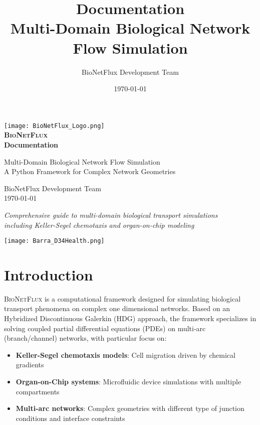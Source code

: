 \documentclass[11pt,a4paper]{article}
\title{\Huge {\textbf{\bionetflux{} Documentation}} \\[0.5cm]
       \Large Multi-Domain Biological Network Flow Simulation}
\author{BioNetFlux Development Team}
\date{\today}
\newcommand{\bionetflux}{\textsc{BioNetFlux}}
\begin{document}
\begin{titlepage}
    \centering
    
    \texttt{[image: BioNetFlux\_Logo.png]}\\[1cm]
    
    {\Huge \textbf{\bionetflux{}} \\[0.5cm]}
    {\Large \textbf{Documentation} \\[1cm]}
    
    {\large Multi-Domain Biological Network Flow Simulation \\[0.5cm]}
    {\large A Python Framework for Complex Network Geometries \\[2cm]}

    
    {\Large BioNetFlux Development Team \\[0.5cm]}
    {\large \today}
    
    \vfill
    
    {\footnotesize 
    \textit{Comprehensive guide to multi-domain biological transport simulations} \\
    \textit{including Keller-Segel chemotaxis and organ-on-chip modeling}
    }
        
        \vskip3cm
        
    \texttt{[image: Barra\_D34Health.png]}\\[2cm]
\end{titlepage}

\tableofcontents


\clearpage

\section{Introduction}

\bionetflux{} is a computational framework designed for simulating biological transport phenomena on complex one dimensional networks. Based on an Hybridized Discontinuous Galerkin (HDG) approach, the framework specializes in solving coupled partial differential equations (PDEs) on multi-arc (branch/channel) networks, with particular focus on:

\begin{itemize}
    \item \textbf{Keller-Segel chemotaxis models}: Cell migration driven by chemical gradients
    \item \textbf{Organ-on-Chip systems}: Microfluidic device simulations with multiple compartments
    \item \textbf{Multi-arc networks}: Complex geometries with different type of junction conditions and interface constraints
\end{itemize}
\end{document}
